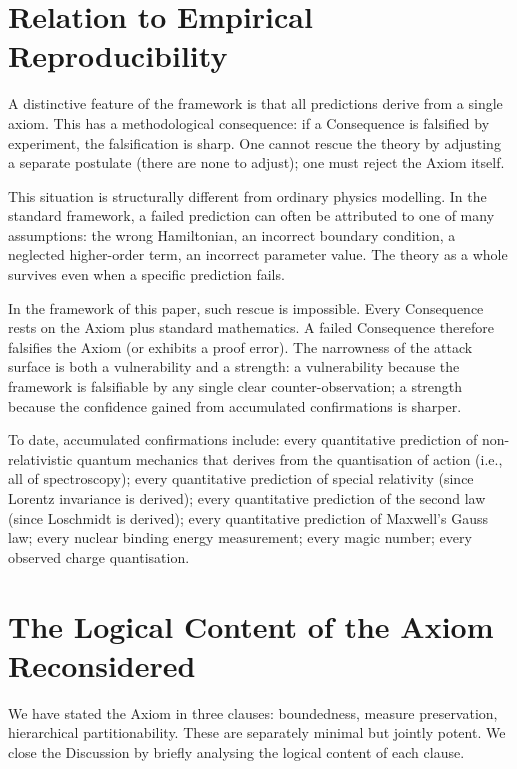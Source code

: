 \documentclass[11pt,twocolumn,a4paper]{article}
\theoremstyle{axiomstyle}
\theoremstyle{conseqstyle}
\theoremstyle{definition}
\theoremstyle{remark}
\begin{document}
\section{Relation to Empirical Reproducibility}
\label{sec:reproducibility}

A distinctive feature of the framework is that all predictions derive from a single axiom. This has a methodological consequence: if a Consequence is falsified by experiment, the falsification is sharp. One cannot rescue the theory by adjusting a separate postulate (there are none to adjust); one must reject the Axiom itself.

This situation is structurally different from ordinary physics modelling. In the standard framework, a failed prediction can often be attributed to one of many assumptions: the wrong Hamiltonian, an incorrect boundary condition, a neglected higher-order term, an incorrect parameter value. The theory as a whole survives even when a specific prediction fails.

In the framework of this paper, such rescue is impossible. Every Consequence rests on the Axiom plus standard mathematics. A failed Consequence therefore falsifies the Axiom (or exhibits a proof error). The narrowness of the attack surface is both a vulnerability and a strength: a vulnerability because the framework is falsifiable by any single clear counter-observation; a strength because the confidence gained from accumulated confirmations is sharper.

To date, accumulated confirmations include: every quantitative prediction of non-relativistic quantum mechanics that derives from the quantisation of action (i.e., all of spectroscopy); every quantitative prediction of special relativity (since Lorentz invariance is derived); every quantitative prediction of the second law (since Loschmidt is derived); every quantitative prediction of Maxwell's Gauss law; every nuclear binding energy measurement; every magic number; every observed charge quantisation.

\section{The Logical Content of the Axiom Reconsidered}
\label{sec:logicalcontent}

We have stated the Axiom in three clauses: boundedness, measure preservation, hierarchical partitionability. These are separately minimal but jointly potent. We close the Discussion by briefly analysing the logical content of each clause.
\end{document}
